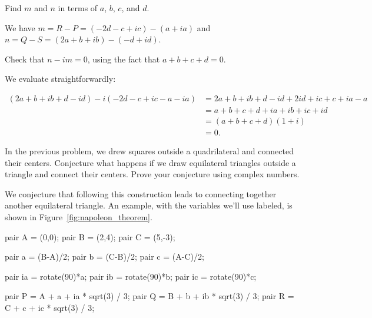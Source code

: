 \documentclass[../key.tex]{subfiles}
\begin{document}
\begin{inner_problem}
\item Find $m$ and $n$ in terms of $a$, $b$, $c$, and $d$.
\end{inner_problem}

We have $m=R-P=(-2d-c+ic)-(a+ia)$ and $n=Q-S=(2a+b+ib)-(-d+id)$.

\begin{inner_problem}
\item Check that $n-im=0$, using the fact that $a+b+c+d=0$.
\end{inner_problem}

We evaluate straightforwardly:

\begin{align*}
(2a+b+ib+d-id)-i(-2d-c+ic-a-ia) &= 2a + b + ib + d - id + 2id + ic + c + ia - a \\
&= a+b+c+d+ia+ib+ic+id \\
&= (a+b+c+d)(1+i) \\
&= 0.
\end{align*}

\begin{outer_problem}
\item In the previous problem, we drew squares outside a quadrilateral and connected their centers. Conjecture what happens if we draw equilateral triangles outside a triangle and connect their centers. Prove your conjecture using complex numbers.
\end{outer_problem}

We conjecture that following this construction leads to connecting together another equilateral triangle. An example, with the variables we'll use labeled, is shown in Figure~\ref{fig:napoleon_theorem}.

\begin{asydef}
pair A = (0,0);
pair B = (2,4);
pair C = (5,-3);

pair a = (B-A)/2;
pair b = (C-B)/2;
pair c = (A-C)/2;

pair ia = rotate(90)*a;
pair ib = rotate(90)*b;
pair ic = rotate(90)*c;

pair P = A + a + ia * sqrt(3) / 3;
pair Q = B + b + ib * sqrt(3) / 3;
pair R = C + c + ic * sqrt(3) / 3;

\end{asydef}
\end{document}
